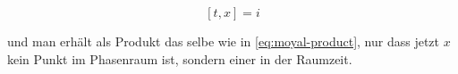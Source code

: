 \begin{equation*}
    \left[t,x\right] = i
\end{equation*}

und man erhält als Produkt das selbe wie in \cref{eq:moyal-product}, nur dass jetzt $x$ kein Punkt im Phasenraum ist, sondern einer in der Raumzeit.






